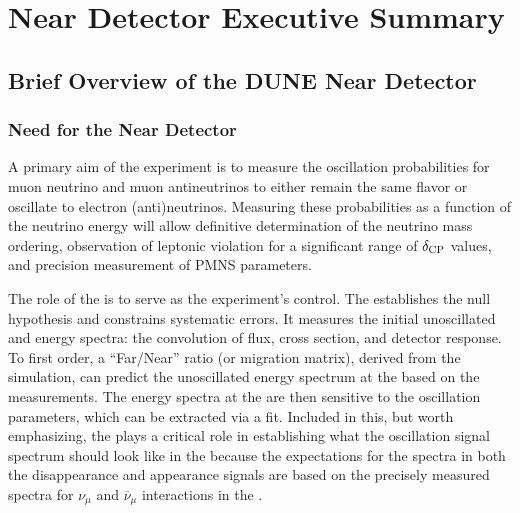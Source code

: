 \chapter{Near Detector Executive Summary}
\label{ch:exsum-nd}


\section{Brief Overview of the DUNE Near Detector}
\label{sec:exsum-nd-overview}


\subsection{Need for the Near Detector}
\label{sec:BriefOverview-need}

A primary aim of the  experiment is to measure the oscillation probabilities for muon neutrino and muon antineutrinos to either remain the same flavor or oscillate to electron (anti)neutrinos. 
Measuring these probabilities as a function of the neutrino energy will allow definitive determination of the neutrino mass ordering, observation of leptonic  violation for a significant range of $\delta_{\rm{CP}}$ values, and precision measurement of PMNS parameters.

The role of the  is to serve as the experiment's control. The  establishes the null hypothesis and constrains systematic errors. It measures the initial unoscillated \numu and \nue energy spectra: the convolution of flux, cross section, and detector response. To first order, a ``Far/Near'' ratio (or migration matrix), derived from the simulation, can predict the unoscillated energy spectrum at the  based on the  measurements.  The energy spectra at the  are then sensitive to the oscillation parameters, which can be extracted via a fit.  Included in this, but worth emphasizing, the  plays a critical role in establishing what the oscillation signal spectrum should look like in the  because the expectations for the spectra in both the disappearance and appearance signals are based on the precisely measured spectra for $\nu_{\mu}$ and $\overline{\nu}_{\mu}$ interactions in the .

